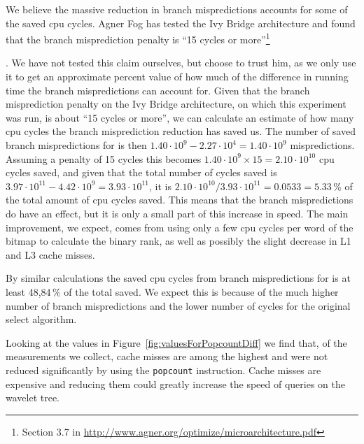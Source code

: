We believe the massive reduction in branch mispredictions accounts for some of the saved cpu cycles.
Agner Fog has tested the Ivy Bridge architecture and found that the branch misprediction penalty is “15 cycles or more”\footnote{Section 3.7 in \url{http://www.agner.org/optimize/microarchitecture.pdf}}\addtocounter{footnote}{-1}\addtocounter{Hfootnote}{-1}.
We have not tested this claim ourselves, but choose to trust him, as we only use it to  get an approximate percent value of how much of the difference in running time the branch mispredictions can account for.
Given that the branch misprediction penalty on the Ivy Bridge architecture, on which this experiment was run, is about “15 cycles or more”\footnotemark, we can calculate an estimate of how many cpu cycles the branch misprediction reduction has saved us.
The number of saved branch mispredictions for  is then $1.40\cdot 10^9 - 2.27\cdot10^4 = 1.40\cdot10^9$ mispredictions. Assuming a penalty of 15 cycles this becomes $1.40\cdot10^9 \times 15 = 2.10\cdot10^{10}$ cpu cycles saved, and given that the total number of cycles saved is $3.97\cdot10^{11} - 4.42\cdot10^9 = 3.93\cdot10^{11}$, it is $2.10\cdot10^{10} / 3.93\cdot10^{11} = 0.0533 = 5.33\,\%$ of the total amount of cpu cycles saved.
This means that the branch mispredictions do have an effect, but it is only a small part of this increase in speed. The main improvement, we expect, comes from using only a few cpu cycles per word of the bitmap to calculate the binary rank, as well as possibly the slight decrease in L1 and L3 cache misses.



By similar calculations the saved cpu cycles from branch mispredictions for  is at least 48,84\,\% of the total saved. We expect this is because of the much higher number of branch mispredictions and the lower number of cycles for the original select algorithm.

Looking at the values in Figure~\ref{fig:valuesForPopcountDiff} we find that, of the measurements we collect, cache misses are among the highest and were not reduced significantly by using the \texttt{popcount} instruction.
Cache misses are expensive and reducing them could greatly increase the speed of queries on the wavelet tree.


